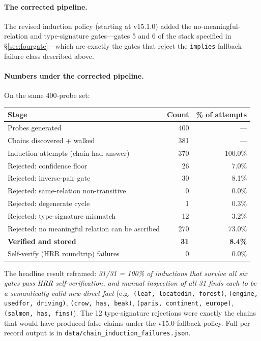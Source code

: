 \documentclass[11pt]{article}
\begin{document}
\paragraph{The corrected pipeline.} The revised induction policy
(starting at v15.1.0) added the no-meaningful-relation and
type-signature gates---gates 5 and 6 of the stack specified in
\S\ref{sec:fourgate}---which are exactly the gates that reject the
\texttt{implies}-fallback failure class described above.

\paragraph{Numbers under the corrected pipeline.} On the same
400-probe set:

\begin{center}
\begin{tabular}{lrr}
\toprule
Stage & Count & \% of attempts \\
\midrule
Probes generated & 400 & --- \\
Chains discovered + walked & 381 & --- \\
Induction attempts (chain had answer) & 370 & 100.0\% \\
\midrule
Rejected: confidence floor & 26 & 7.0\% \\
Rejected: inverse-pair gate & 30 & 8.1\% \\
Rejected: same-relation non-transitive & 0 & 0.0\% \\
Rejected: degenerate cycle & 1 & 0.3\% \\
Rejected: type-signature mismatch & 12 & 3.2\% \\
Rejected: no meaningful relation can be ascribed & 270 & 73.0\% \\
\midrule
\textbf{Verified and stored} & \textbf{31} & \textbf{8.4\%} \\
Self-verify (HRR roundtrip) failures & 0 & 0.0\% \\
\bottomrule
\end{tabular}
\end{center}

The headline result reframed: \emph{31/31 = 100\% of inductions
that survive all six gates pass HRR self-verification, and manual
inspection of all 31 finds each to be a semantically valid new
direct fact} (e.g.\ \texttt{(leaf, locatedin, forest)},
\texttt{(engine, usedfor, driving)},
\texttt{(crow, has, beak)}, \texttt{(paris, continent, europe)},
\texttt{(salmon, has, fins)}). The 12 type-signature rejections
were exactly the chains that would have produced false claims
under the v15.0 fallback policy. Full per-record output is in
\texttt{data/chain\_induction\_failures.json}.
\end{document}

